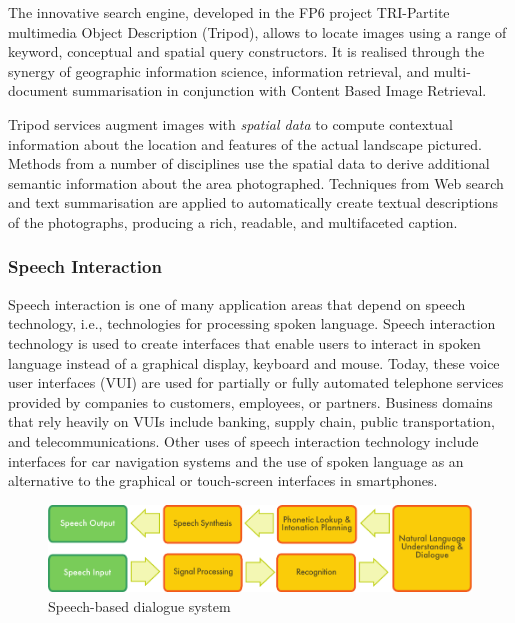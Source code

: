 \begin{multicols}{2}
The innovative search engine, developed in the FP6 project TRI-Partite multimedia Object Description (Tripod), allows to locate images using a range of keyword, conceptual and spatial query constructors.
It is realised through the synergy of geographic information science, information retrieval, and multi-document summarisation in conjunction with Content Based Image Retrieval.

Tripod services augment images with \textit{spatial data }to compute contextual information about the location and features of the actual landscape pictured.
Methods from a number of disciplines use the spatial data to derive additional semantic information about the area photographed.
Techniques from Web search and text summarisation are applied to automatically create textual descriptions of the photographs, producing a rich, readable, and multifaceted caption.



\subsubsection{Speech Interaction}
Speech interaction is one of many application areas that depend on speech technology, i.e., technologies for processing spoken language.
Speech interaction technology is used to create interfaces that enable users to interact in spoken language instead of a graphical display, keyboard and mouse.
Today, these voice user interfaces (VUI) are used for partially or fully automated telephone services provided by companies to customers, employees, or partners.
Business domains that rely heavily on VUIs include banking, supply chain, public transportation, and telecommunications.
Other uses of speech interaction technology include interfaces for car navigation systems and the use of spoken language as an alternative to the graphical or touch-screen interfaces in smartphones.

\begin{figure}[htb]
  \center
  \includegraphics[width=\textwidth]{../_media/english/simple_speech-based_dialogue_architecture}
  \caption{Speech-based dialogue system}
  \label{fig:dialoguearch_en}
\end{figure}


\end{multicols}

